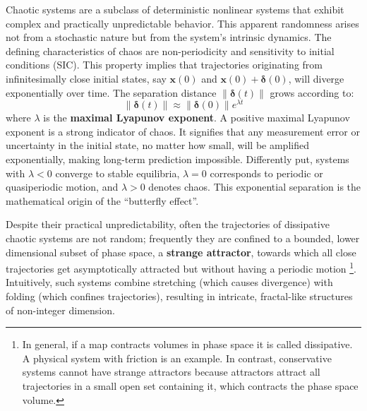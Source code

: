 \documentclass[a4paper,12pt]{article}
\begin{document}
Chaotic systems are a subclass of deterministic nonlinear systems that exhibit complex and practically unpredictable behavior. This apparent randomness arises not from a stochastic nature but from the system's intrinsic dynamics. The defining characteristics of chaos are non-periodicity and sensitivity to initial conditions (SIC). This property implies that trajectories originating from infinitesimally close initial states, say $\mathbf{x}(0)$ and $\mathbf{x}(0) + \bm{\delta}(0)$, will diverge exponentially over time. The separation distance $\|\bm{\delta}(t)\|$ grows according to:
\begin{equation}
    \|\bm{\delta}(t)\| \approx \|\bm{\delta}(0)\| e^{\lambda t}
\end{equation}
where $\lambda$ is the \textbf{maximal Lyapunov exponent}. A positive maximal Lyapunov exponent is a strong indicator of chaos. It signifies that any measurement error or uncertainty in the initial state, no matter how small, will be amplified exponentially, making long-term prediction impossible. Differently put, systems with $\lambda < 0$ converge to stable equilibria, $\lambda = 0$ corresponds to periodic or quasiperiodic motion, and $\lambda > 0$ denotes chaos. This exponential separation is the mathematical origin of the “butterfly effect”.

Despite their practical unpredictability, often the trajectories of dissipative chaotic systems are not random; frequently they are confined to a bounded, lower dimensional subset of phase space, a \textbf{strange attractor}, towards which all close trajectories get asymptotically attracted but without having a periodic motion \footnote{In general, if a map contracts volumes in phase space it is called dissipative. A physical system with friction is an example. In contrast, conservative systems cannot have strange attractors because attractors attract all trajectories in a small open set containing it, which contracts the phase space volume.}.
 Intuitively, such systems combine stretching (which causes divergence) with folding (which confines trajectories), resulting in intricate, fractal-like structures of non-integer dimension. 
\end{document}
